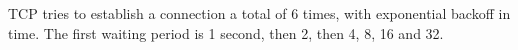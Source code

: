 TCP tries to establish a connection a total of 6 times, with exponential backoff in time. The first waiting period is 1 second, then 2, then 4, 8, 16 and 32.